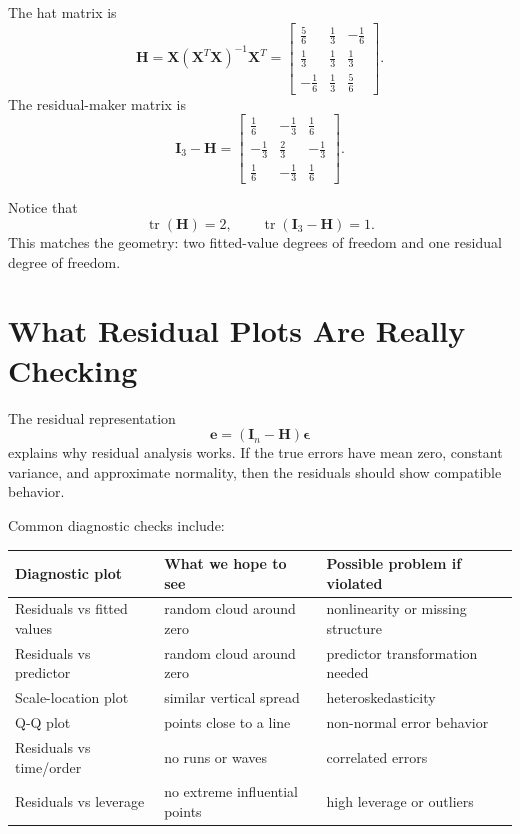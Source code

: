 {The hat matrix is
\begin{equation}
  \mathbf{H}
  =\mathbf{X}(\mathbf{X}^T\mathbf{X})^{-1}\mathbf{X}^T
  =\begin{bmatrix}
    \frac{5}{6} & \frac{1}{3} & -\frac{1}{6}\\
    \frac{1}{3} & \frac{1}{3} & \frac{1}{3}\\
    -\frac{1}{6} & \frac{1}{3} & \frac{5}{6}
  \end{bmatrix}.
\end{equation}
The residual-maker matrix is
\begin{equation}
  \mathbf{I}_3-\mathbf{H}
  =\begin{bmatrix}
    \frac{1}{6} & -\frac{1}{3} & \frac{1}{6}\\
    -\frac{1}{3} & \frac{2}{3} & -\frac{1}{3}\\
    \frac{1}{6} & -\frac{1}{3} & \frac{1}{6}
  \end{bmatrix}.
\end{equation}

Notice that
\begin{equation}
  \operatorname{tr}(\mathbf{H})=2,
  \qquad
  \operatorname{tr}(\mathbf{I}_3-\mathbf{H})=1.
\end{equation}
This matches the geometry: two fitted-value degrees of freedom and one residual degree of freedom.
}

\section{What Residual Plots Are Really Checking}

The residual representation
\begin{equation}
  \mathbf{e}=(\mathbf{I}_n-\mathbf{H})\boldsymbol{\epsilon}
\end{equation}
explains why residual analysis works.  If the true errors have mean zero, constant variance, and approximate normality, then the residuals should show compatible behavior.

Common diagnostic checks include:
\begin{center}
\begin{tabular}{lll}
\toprule
Diagnostic plot & What we hope to see & Possible problem if violated \\
\midrule
Residuals vs fitted values & random cloud around zero & nonlinearity or missing structure \\
Residuals vs predictor & random cloud around zero & predictor transformation needed \\
Scale-location plot & similar vertical spread & heteroskedasticity \\
Q-Q plot & points close to a line & non-normal error behavior \\
Residuals vs time/order & no runs or waves & correlated errors \\
Residuals vs leverage & no extreme influential points & high leverage or outliers \\
\bottomrule
\end{tabular}
\end{center}

